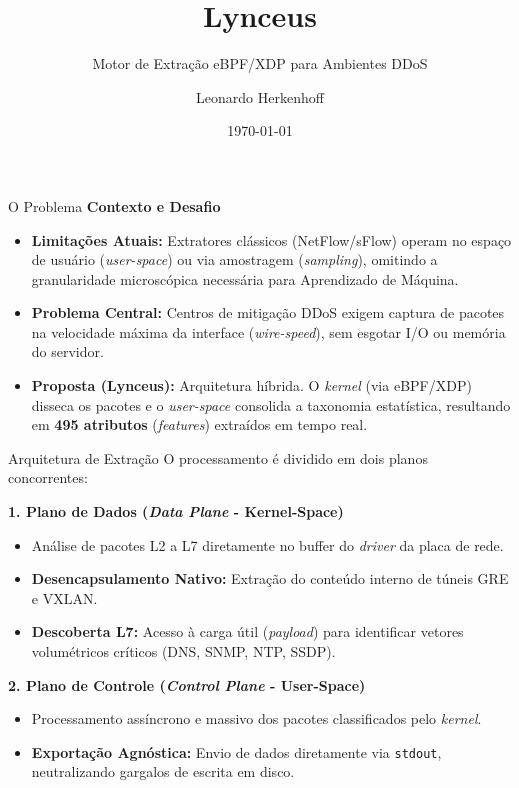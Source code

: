 \documentclass[aspectratio=169]{beamer}
\title[Lynceus]{Lynceus}
\subtitle{Motor de Extração eBPF/XDP para Ambientes DDoS}
\author{Leonardo Herkenhoff}
\institute[PPComp/IFES]{Mestrado Profissional em Computação Aplicada (PPComp) -- IFES}
\date{\today}
\begin{document}
\frame{\titlepage}

\begin{frame}{O Problema}
    \textbf{Contexto e Desafio}
    \begin{itemize}
        \item \textbf{Limitações Atuais:} Extratores clássicos (NetFlow/sFlow) operam no espaço de usuário (\textit{user-space}) ou via amostragem (\textit{sampling}), omitindo a granularidade microscópica necessária para Aprendizado de Máquina.
        \item \textbf{Problema Central:} Centros de mitigação DDoS exigem captura de pacotes na velocidade máxima da interface (\textit{wire-speed}), sem esgotar I/O ou memória do servidor.
        \item \textbf{Proposta (Lynceus):} Arquitetura híbrida. O \textit{kernel} (via eBPF/XDP) disseca os pacotes e o \textit{user-space} consolida a taxonomia estatística, resultando em \textbf{495 atributos} (\textit{features}) extraídos em tempo real.
    \end{itemize}
\end{frame}

\begin{frame}{Arquitetura de Extração}
    O processamento é dividido em dois planos concorrentes:
    \vspace{0.3cm}
    
    \textbf{1. Plano de Dados (\textit{Data Plane} - Kernel-Space)}
    \begin{itemize}
        \item Análise de pacotes L2 a L7 diretamente no buffer do \textit{driver} da placa de rede.
        \item \textbf{Desencapsulamento Nativo:} Extração do conteúdo interno de túneis GRE e VXLAN.
        \item \textbf{Descoberta L7:} Acesso à carga útil (\textit{payload}) para identificar vetores volumétricos críticos (DNS, SNMP, NTP, SSDP).
    \end{itemize}
    \vspace{0.2cm}
    
    \textbf{2. Plano de Controle (\textit{Control Plane} - User-Space)}
    \begin{itemize}
        \item Processamento assíncrono e massivo dos pacotes classificados pelo \textit{kernel}.
        \item \textbf{Exportação Agnóstica:} Envio de dados diretamente via \texttt{stdout}, neutralizando gargalos de escrita em disco.
    \end{itemize}
\end{frame}
\end{document}
